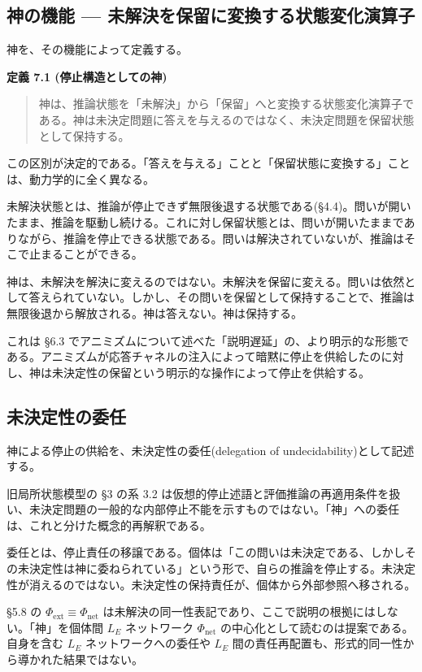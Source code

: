 \bigskip


\subsection{神の機能 — 未解決を保留に変換する状態変化演算子}


神を、その機能によって定義する。

\textbf{定義 7.1 (停止構造としての神)}

\begin{quote}
神は、推論状態を「未解決」から「保留」へと変換する状態変化演算子である。神は未決定問題に答えを与えるのではなく、未決定問題を保留状態として保持する。
\end{quote}


この区別が決定的である。「答えを与える」ことと「保留状態に変換する」ことは、動力学的に全く異なる。

未解決状態とは、推論が停止できず無限後退する状態である(\S{}4.4)。問いが開いたまま、推論を駆動し続ける。これに対し保留状態とは、問いが開いたままでありながら、推論を停止できる状態である。問いは解決されていないが、推論はそこで止まることができる。

神は、未解決を解決に変えるのではない。未解決を保留に変える。問いは依然として答えられていない。しかし、その問いを保留として保持することで、推論は無限後退から解放される。神は答えない。神は保持する。

これは \S{}6.3 でアニミズムについて述べた「説明遅延」の、より明示的な形態である。アニミズムが応答チャネルの注入によって暗黙に停止を供給したのに対し、神は未決定性の保留という明示的な操作によって停止を供給する。

\bigskip


\subsection{未決定性の委任}


神による停止の供給を、未決定性の委任(delegation of undecidability)として記述する。

旧局所状態模型の \S{}3 の系 3.2 は仮想的停止述語と評価推論の再適用条件を扱い、未決定問題の一般的な内部停止不能を示すものではない。「神」への委任は、これと分けた概念的再解釈である。

委任とは、停止責任の移譲である。個体は「この問いは未決定である、しかしその未決定性は神に委ねられている」という形で、自らの推論を停止する。未決定性が消えるのではない。未決定性の保持責任が、個体から外部参照へ移される。

\S{}5.8 の $\Phi_{\text{ext}} \equiv \Phi_{\text{net}}$ は未解決の同一性表記であり、ここで説明の根拠にはしない。「神」を個体間 $L_E$ ネットワーク $\Phi_{\text{net}}$ の中心化として読むのは提案である。自身を含む $L_E$ ネットワークへの委任や $L_E$ 間の責任再配置も、形式的同一性から導かれた結果ではない。


